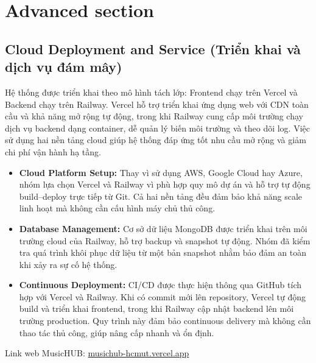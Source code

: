 \section{Advanced section}
\subsection{Cloud Deployment and Service (Triển khai và dịch vụ đám mây)}
\cach Hệ thống được triển khai theo mô hình tách lớp: Frontend chạy trên Vercel và Backend chạy trên Railway. Vercel hỗ trợ triển khai ứng dụng web với CDN toàn cầu và khả năng mở rộng tự động, trong khi Railway cung cấp môi trường chạy dịch vụ backend dạng container, dễ quản lý biến môi trường và theo dõi log. Việc sử dụng hai nền tảng cloud giúp hệ thống đáp ứng tốt nhu cầu mở rộng và giảm chi phí vận hành hạ tầng.
\begin{itemize}
    \item \textbf{Cloud Platform Setup:} Thay vì sử dụng AWS, Google Cloud hay Azure, nhóm lựa chọn Vercel và Railway vì phù hợp quy mô dự án và hỗ trợ tự động build–deploy trực tiếp từ Git. Cả hai nền tảng đều đảm bảo khả năng scale linh hoạt mà không cần cấu hình máy chủ thủ công.
    \item \textbf{Database Management:} Cơ sở dữ liệu MongoDB được triển khai trên môi trường cloud của Railway, hỗ trợ backup và snapshot tự động. Nhóm đã kiểm tra quá trình khôi phục dữ liệu từ một bản snapshot nhằm bảo đảm an toàn khi xảy ra sự cố hệ thống.
    \item \textbf{Continuous Deployment:} CI/CD được thực hiện thông qua GitHub tích hợp với Vercel và Railway. Khi có commit mới lên repository, Vercel tự động build và triển khai frontend, trong khi Railway cập nhật backend lên môi trường production. Quy trình này đảm bảo continuous delivery mà không cần thao tác thủ công, giúp nâng cấp nhanh và ổn định.
\end{itemize}

Link web MusicHUB: \href{https://musichub-hcmut.vercel.app/}{musichub-hcmut.vercel.app}

